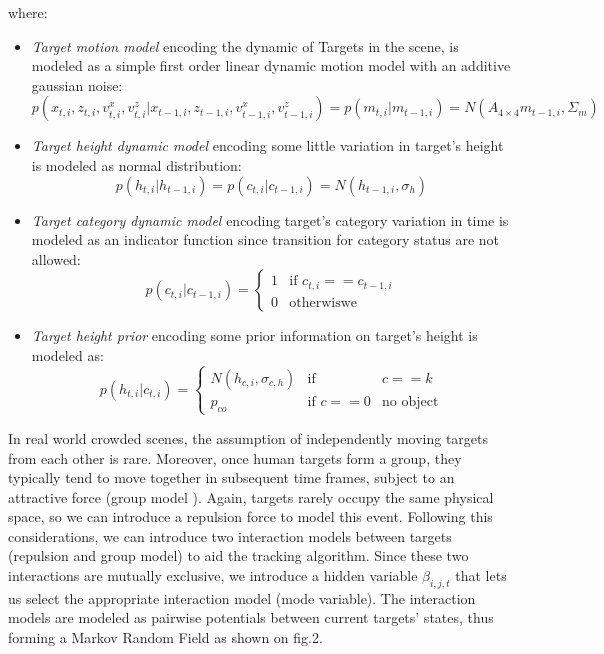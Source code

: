 where:
\begin{itemize}
\item \textit{Target motion model} encoding the dynamic of Targets in the scene, is modeled as a simple first order linear dynamic motion model with an additive gaussian noise:
$$
p(x_{t,i}, z_{t,i}, v_{t,i}^x,v_{t,i}^z | x_{t-1,i}, z_{t-1,i}, v_{t-1,i}^x,v_{t-1,i}^z)=
p(m_{t,i} | m_{t-1,i})=N(A_{4\times4} m_{t-1,i} , \Sigma_m )
$$
\item \textit{Target height dynamic model} encoding some little variation in target's height is modeled as normal distribution:
$$
p(h_{t,i} |h_{t-1,i}) =
 p(c_{t,i} |c_{t-1,i})= N(h_{t-1,i} , \sigma_h ) 
$$
\item \textit{Target category dynamic model} encoding  target's category variation in time is modeled as an indicator function since transition for category status are not allowed:
$$
 p(c_{t,i} |c_{t-1,i})= \left\{
\begin{array}{rl}
1 & \mbox{if }  c_{t,i}==c_{t-1,i} \\
0 & \mbox{otherwiswe } 
\end{array}
\right.
$$

\item \textit{Target height prior} encoding some prior information on target's height is  modeled as:
$$
 p(h_{t,i} |c_{t,i})= \left\{
\begin{array}{rcl}
 N(h_{c,i} , \sigma_{c,h} )  & \mbox{if } & c==k \\
 p_{co} & \mbox{if }  c==0  & \mbox{no object}
\end{array}
\right.
$$
\end{itemize}

In real world crowded scenes, the assumption of independently moving targets from each other is rare. Moreover, once human targets form a group, they typically tend to move together in subsequent time frames, subject to an attractive force (group model ). Again, targets rarely occupy the same physical space, so we can introduce a repulsion force to model this event. Following this considerations, we can introduce two interaction models between targets (repulsion and group model) to aid the tracking algorithm.
Since these two interactions are mutually exclusive, we introduce a hidden variable $\beta_{i,j,t}$ that lets us select the appropriate interaction model (mode
variable).
The interaction models are modeled as pairwise potentials between current targets’ states, thus forming a Markov Random Field as shown on fig.2. 

